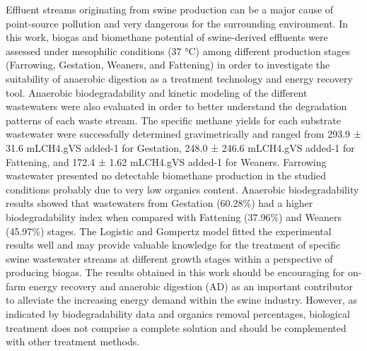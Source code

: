 Effluent streams originating from swine production can be a major cause of point-source pollution and very dangerous for the surrounding environment. In this work, biogas and biomethane potential of swine-derived effluents were assessed under mesophilic conditions (37 °C) among different production stages (Farrowing, Gestation, Weaners, and Fattening) in order to investigate the suitability of anaerobic digestion as a treatment technology and energy recovery tool. Anaerobic biodegradability and kinetic modeling of the different wastewaters were also evaluated in order to better understand the degradation patterns of each waste stream. The specific methane yields for each substrate wastewater were successfully determined gravimetrically and ranged from 293.9 ± 31.6 mLCH4.gVS added-1 for Gestation, 248.0 ± 246.6 mLCH4.gVS added-1 for Fattening, and 172.4 ± 1.62 mLCH4.gVS added-1 for Weaners. Farrowing wastewater presented no detectable biomethane production in the studied conditions probably due to very low organics content.  Anaerobic biodegradability results showed that wastewaters from Gestation (60.28\%) had a higher biodegradability index when compared with Fattening (37.96\%) and Weaners (45.97\%) stages. The Logistic and Gompertz model fitted the experimental results well and may provide valuable knowledge for the treatment of specific swine wastewater streams at different growth stages within a perspective of producing biogas. The results obtained in this work should be encouraging for on-farm energy recovery and anaerobic digestion (AD) as an important contributor to alleviate the increasing energy demand within the swine industry. However, as indicated by biodegradability data and organics removal percentages, biological treatment does not comprise a complete solution and should be complemented with other treatment methods.